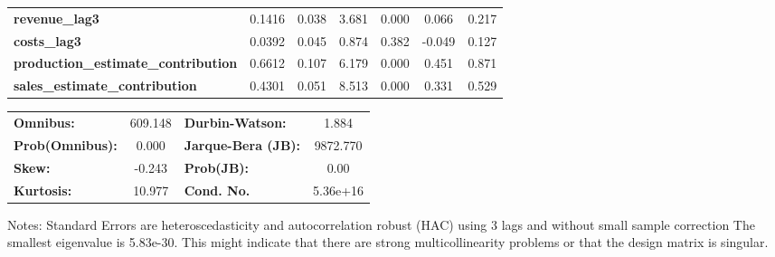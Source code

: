 \begin{center}
\begin{tabular}{lcccccc}
\textbf{revenue\_lag3}                      &       0.1416  &        0.038     &     3.681  &         0.000        &        0.066    &        0.217     \\
\textbf{costs\_lag3}                        &       0.0392  &        0.045     &     0.874  &         0.382        &       -0.049    &        0.127     \\
\textbf{production\_estimate\_contribution} &       0.6612  &        0.107     &     6.179  &         0.000        &        0.451    &        0.871     \\
\textbf{sales\_estimate\_contribution}      &       0.4301  &        0.051     &     8.513  &         0.000        &        0.331    &        0.529     \\
\bottomrule
\end{tabular}
\begin{tabular}{lclc}
\textbf{Omnibus:}       & 609.148 & \textbf{  Durbin-Watson:     } &    1.884  \\
\textbf{Prob(Omnibus):} &   0.000 & \textbf{  Jarque-Bera (JB):  } & 9872.770  \\
\textbf{Skew:}          &  -0.243 & \textbf{  Prob(JB):          } &     0.00  \\
\textbf{Kurtosis:}      &  10.977 & \textbf{  Cond. No.          } & 5.36e+16  \\
\bottomrule
\end{tabular}
\end{center}

Notes: \newline
 [1] Standard Errors are heteroscedasticity and autocorrelation robust (HAC) using 3 lags and without small sample correction \newline
 [2] The smallest eigenvalue is 5.83e-30. This might indicate that there are \newline
 strong multicollinearity problems or that the design matrix is singular.